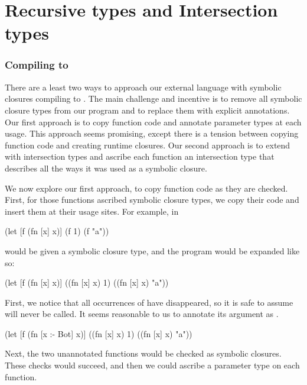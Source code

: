 \chapter{Recursive types and Intersection types}

\subsection{Compiling to \ltiFsub}

There are a least two ways to approach our external language
with symbolic closures compiling to \ltiFsub.
The main challenge and incentive is to remove all symbolic
closure types from our program and to replace them with
explicit annotations.
Our first approach is to copy function code and annotate
parameter types at each usage.
This approach seems promising, except there is a tension between
copying function code and creating runtime closures.
Our second approach is to extend \ltiFsub with intersection types
and ascribe each function an intersection type that 
describes all the ways it was used as a symbolic closure.

We now explore our first approach, to copy function code as they
are checked.
First, for those functions ascribed symbolic closure types, we
copy their code and insert them at their usage sites.
For example,  in 

\begin{cljlisting}
(let [f (fn [x] x)]
  (f 1)
  (f "a"))
\end{cljlisting}

would be given a symbolic closure type, and
the program would be expanded like so:

\begin{cljlisting}
(let [f (fn [x] x)]
  ((fn [x] x) 1)
  ((fn [x] x) "a"))
\end{cljlisting}

First, we notice that all occurrences of  have disappeared,
so it is safe to assume  will never be called. It seems
reasonable to us to annotate its argument as .

\begin{cljlisting}
(let [f (fn [x :- Bot] x)]
  ((fn [x] x) 1)
  ((fn [x] x) "a"))
\end{cljlisting}

Next, the two unannotated functions would be checked as symbolic closures.
These checks would succeed, and then we could ascribe a parameter type on
each function.

